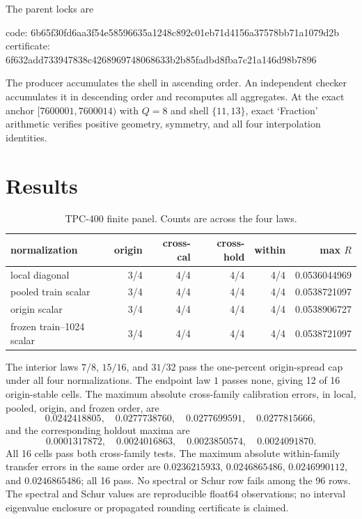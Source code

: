\documentclass[10pt]{article}
\begin{document}
The parent locks are
\begin{center}
\small\ttfamily
code: 6b65f30fd6aa3f54e58596635a1248c892c01eb71d4156a37578bb71a1079d2b\\
certificate: 6f632add733947838c4268969748068633b2b85fadbd8fba7c21a146d98b7896
\end{center}

The producer accumulates the shell in ascending order.  An independent
checker accumulates it in descending order and recomputes all aggregates.  At
the exact anchor $[7600001,7600014)$ with $Q=8$ and shell $\{11,13\}$,
exact `Fraction' arithmetic verifies positive geometry, symmetry, and all four
interpolation identities.

\section{Results}

\begin{table}[t]
\centering
\caption{TPC-400 finite panel.  Counts are across the four laws.}
\label{tab:summary}
\small
\begin{tabular}{@{}lrrrrr@{}}
\toprule
normalization & origin & cross-cal & cross-hold & within & max $R$\\
\midrule
local diagonal & 3/4 & 4/4 & 4/4 & 4/4 & 0.0536044969\\
pooled train scalar & 3/4 & 4/4 & 4/4 & 4/4 & 0.0538721097\\
origin scalar & 3/4 & 4/4 & 4/4 & 4/4 & 0.0538906727\\
frozen train--1024 scalar & 3/4 & 4/4 & 4/4 & 4/4 & 0.0538721097\\
\bottomrule
\end{tabular}
\end{table}

The interior laws $7/8$, $15/16$, and $31/32$ pass the one-percent
origin-spread cap under all four normalizations.  The endpoint law $1$ passes
none, giving 12 of 16 origin-stable cells.  The maximum absolute cross-family
calibration errors, in local, pooled, origin, and frozen order, are
\[
0.0242418805,\quad 0.0277738760,\quad
0.0277699591,\quad 0.0277815666,
\]
and the corresponding holdout maxima are
\[
0.0001317872,\quad 0.0024016863,\quad
0.0023850574,\quad 0.0024091870.
\]
All 16 cells pass both cross-family tests.  The maximum absolute within-family
transfer errors in the same order are
$0.0236215933$, $0.0246865486$, $0.0246990112$, and
$0.0246865486$; all 16 pass.  No spectral or Schur row fails among the 96
rows.  The spectral and Schur values are reproducible float64 observations;
no interval eigenvalue enclosure or propagated rounding certificate is claimed.
\end{document}
